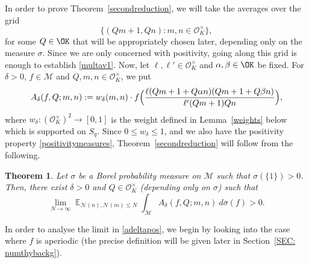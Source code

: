 \documentclass[11pt]{amsart}
\newtheorem{theorem}[lemma]{Theorem}
\theoremstyle{definition}
\DeclareMathOperator*{\E}{\mathbb{E}}
\newcommand{\NN}{{\mathcal N}}
\begin{document}
In order to prove Theorem~\ref{secondreduction}, we will take the averages over the grid
\[
\{ (Qm+1, Qn) : m, n \in \mathcal{O}_K^{\times}\},
\]
for some $Q \in \OK$ that will be appropriately chosen later, depending only on the measure $\sigma$. Since we are only concerned with positivity, going along this grid is enough to establish \eqref{multav1}. Now, let $\ell,\ell' \in \mathcal{O}_K^{\times}$ and $\alpha,\beta \in \OK$ be fixed. For $\delta>0$, $f \in \mathcal{M}$ and $Q, m, n \in \mathcal{O}_K^{\times}$, we put
\begin{equation}
A_{\delta}(f,Q; m,n):= w_{\delta}(m,n)\cdot  f\Bigl(\frac{\ell(Qm+1+Q\alpha n)(Qm+1+Q\beta n)}{\ell' (Qm+1)Qn}\Bigr),
\end{equation}
where $w_{\delta}: (\mathcal{O}_K^{\times})^2 \to [0,1]$ is the weight defined in Lemma~\ref{weights} below which is supported on $S_{q}$. Since $0 \leq w_{\delta}\leq 1 $, and we also have the positivity property \eqref{positivitymeasures}, Theorem~\ref{secondreduction} will follow from the following.

\begin{theorem}\label{thirdreduction}
Let $\sigma$ be a Borel probability measure on $\mathcal{M}$ such that $\sigma(\{1\})>0$. Then, there exist $\delta>0$ and $Q \in \mathcal{O}_K^{\times}$ (depending only on $\sigma$) such that
\begin{equation}\label{adeltapos}
\lim_{N \to \infty} \E_{\NN(n),\NN(m) \leq N} \int_{\mathcal{M}} A_{\delta}(f,Q; m,n) \ d\sigma(f)>0.
\end{equation}
\end{theorem}
In order to analyse the limit in \eqref{adeltapos}, we begin by looking into the case where $f$ is aperiodic (the precise definition will be given later in Section~\ref{SEC: numthybackg}). %
\end{document}
